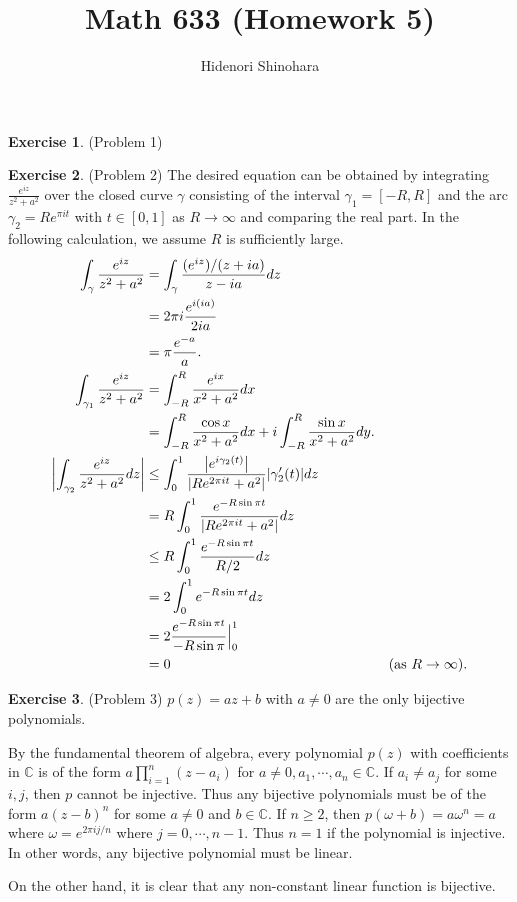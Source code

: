 \documentclass[12pt, psamsfonts]{amsart}
\theoremstyle{definition}
\newtheorem*{exer}{Exercise}
\theoremstyle{remark}
\numberwithin{equation}{section}
\begin{document}
\title{Math 633 (Homework 5)}
\author{Hidenori Shinohara}
\maketitle

\begin{exer}{(Problem 1)}
  \todo[inline,caption={}]{
  }
\end{exer}

\begin{exer}{(Problem 2)}
  The desired equation can be obtained by integrating $\frac{e^{iz}}{z^2 + a^2}$ over the closed curve $\gamma$ consisting of the interval $\gamma_1 = [-R, R]$ and the arc $\gamma_2 = Re^{\pi it}$ with $t \in [0, 1]$ as $R \rightarrow \infty$ and comparing the real part.
  In the following calculation, we assume $R$ is sufficiently large.
  \begin{align*}
    \int_{\gamma} \frac{e^{iz}}{z^2 + a^2}
      &= \int_{\gamma} \frac{(e^{iz})/(z + ia)}{z - ia} dz \\
      &= 2\pi i\frac{e^{i(ia)}}{2ia} \\
      &= \pi\frac{e^{-a}}{a}. \\
    \int_{\gamma_1} \frac{e^{iz}}{z^2 + a^2}
      &= \int_{-R}^{R} \frac{e^{ix}}{x^2 + a^2} dx \\
      &= \int_{-R}^{R} \frac{\cos x}{x^2 + a^2} dx + i\int_{-R}^{R} \frac{\sin x}{x^2 + a^2} dy. \\
    \abs{\int_{\gamma_2}\frac{e^{iz}}{z^2 + a^2} dz}
      &\leq \int_{0}^{1}\frac{\abs{e^{i\gamma_2(t)}}}{\abs{Re^{2\pi it} + a^2}}\abs{\gamma_2'(t)} dz \\
      &= R\int_{0}^{1} \frac{e^{-R\sin \pi t}}{\abs{Re^{2\pi it} + a^2}} dz \\
      &\leq R\int_{0}^{1} \frac{e^{-R\sin \pi t}}{R / 2} dz \\
      &= 2\int_{0}^{1} e^{-R\sin \pi t} dz \\
      &= 2\frac{e^{-R\sin \pi t}}{-R \sin \pi} \Big{\vert}^1_0 \\
      &= 0 & \text{(as $R \rightarrow \infty$)}.
  \end{align*}
\end{exer}

\begin{exer}{(Problem 3)}
  $p(z) = az + b$ with $a \ne 0$ are the only bijective polynomials.

  By the fundamental theorem of algebra, every polynomial $p(z)$ with coefficients in $\mathbb{C}$ is of the form $a\prod_{i=1}^{n}(z - a_i)$ for $a \ne 0, a_1, \cdots, a_n \in \mathbb{C}$.
  If $a_i \ne a_j$ for some $i, j$, then $p$ cannot be injective.
  Thus any bijective polynomials must be of the form $a(z - b)^n$ for some $a \ne 0$ and $b \in \mathbb{C}$.
  If $n \geq 2$, then $p(\omega + b) = a\omega^n = a$ where $\omega = e^{2\pi i j / n}$ where $j = 0, \cdots, n - 1$.
  Thus $n = 1$ if the polynomial is injective.
  In other words, any bijective polynomial must be linear.

  On the other hand, it is clear that any non-constant linear function is bijective.
\end{exer}
\end{document}
